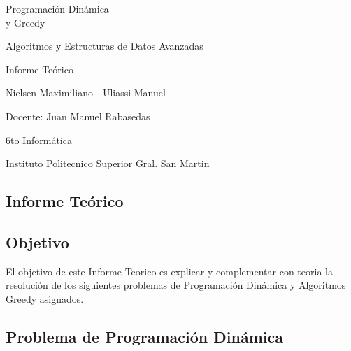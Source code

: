 \documentclass[10pt]{article}
\begin{document}
\pagestyle{fancy}
\renewcommand{\headrulewidth}{0.4pt}
\renewcommand{\footrulewidth}{0.4pt}

\begin{titlepage}
\null
\vspace{4cm}
\centering
{\Huge Programaci\'on Din\'amica\\ y Greedy}

\vspace{0.2cm}

{\LARGE Algoritmos y Estructuras de Datos Avanzadas}

\vspace{0.2cm}

{\large Informe Te\'orico}

\vspace{1.5cm}

{\LARGE Nielsen Maximiliano - Uliassi Manuel}

\vspace{0.15cm}

{\large Docente: Juan Manuel Rabasedas}

\vspace{0.15cm}

{\large 6to Inform\'atica}

\vspace{0.15cm}

{\large Instituto Politecnico Superior Gral. San Martin}
\vfill

\end{titlepage}
\begin{center}
\section*{\LARGE Informe Te\'orico}
\end{center}
\subsection*{Objetivo}
El objetivo de este Informe Teorico es explicar y complementar con teoria la resoluci\'on de los siguientes problemas de Programaci\'on Din\'amica y Algoritmos Greedy asignados.
\subsection*{Problema de Programaci\'on Din\'amica}
\end{document}
